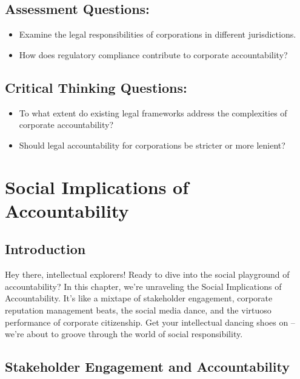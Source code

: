 \documentclass[
  letterpaper,
  DIV=11,
  numbers=noendperiod]{scrreprt}
\begin{document}
\subsection{Assessment Questions:}\label{assessment-questions-5}

\begin{itemize}
\item
  Examine the legal responsibilities of corporations in different
  jurisdictions.
\item
  How does regulatory compliance contribute to corporate accountability?
\end{itemize}

\subsection{Critical Thinking
Questions:}\label{critical-thinking-questions-3}

\begin{itemize}
\item
  To what extent do existing legal frameworks address the complexities
  of corporate accountability?
\item
  Should legal accountability for corporations be stricter or more
  lenient?
\end{itemize}

\section{Social Implications of
Accountability}\label{social-implications-of-accountability}

\subsection{Introduction}\label{introduction-5}

Hey there, intellectual explorers! Ready to dive into the social
playground of accountability? In this chapter, we're unraveling the
Social Implications of Accountability. It's like a mixtape of
stakeholder engagement, corporate reputation management beats, the
social media dance, and the virtuoso performance of corporate
citizenship. Get your intellectual dancing shoes on -- we're about to
groove through the world of social responsibility.

\subsection{Stakeholder Engagement and
Accountability}\label{stakeholder-engagement-and-accountability}
\end{document}
